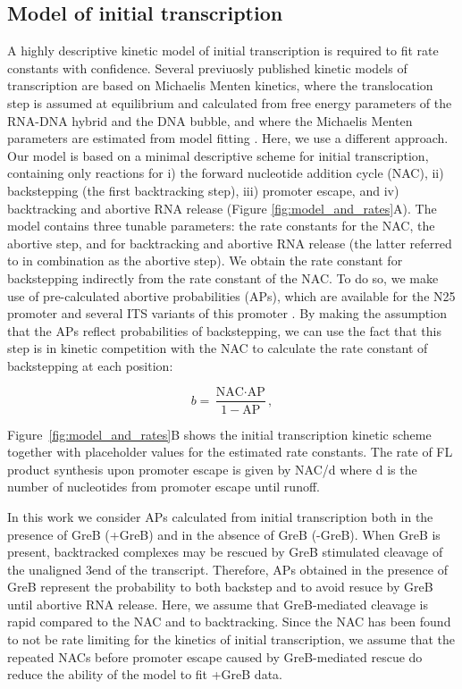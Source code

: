 %
\subsection{Model of initial transcription}
A highly descriptive kinetic model of initial transcription is required to fit
rate constants with confidence. Several previuosly published kinetic models of
transcription are based on Michaelis Menten kinetics, where the translocation
step is assumed at equilibrium and calculated from free energy parameters of
the RNA-DNA hybrid and the DNA bubble, and where
the Michaelis Menten parameters are estimated from model fitting
\cite{guajardo_model_1997, bai_sequence-dependent_2004,
bai_mechanochemical_2007, tadigotla_thermodynamic_2006}. Here, we use a
different approach. Our model is based on a minimal descriptive scheme for
initial transcription, containing only reactions for i) the forward nucleotide
addition cycle (NAC), ii) backstepping (the first backtracking step), iii)
promoter escape, and iv) backtracking and abortive RNA release (Figure
\ref{fig:model_and_rates}A). The model contains three tunable parameters:
the rate constants for the NAC, the abortive step, and for backtracking and
abortive RNA release (the latter referred to in combination as the abortive
step). We obtain the rate constant for backstepping indirectly from the rate
constant of the NAC. To do so, we make use of pre-calculated abortive
probabilities\cite{hsu_quantitative_1996} (APs), which are available for the
N25 promoter and several ITS variants of this promoter
\cite{hsu_initial_2006}. By making the assumption that the APs reflect
probabilities of backstepping, we can use the fact that this step is in
kinetic competition with the NAC to calculate the rate constant of
backstepping at each position:

\begin{equation*}
  b = \frac{\text{NAC}\cdot \text{AP}}{1-\text{AP}},
\end{equation*}

Figure~\ref{fig:model_and_rates}B shows the initial transcription kinetic scheme
together with placeholder values for the estimated rate constants.
The rate of FL product synthesis upon promoter escape is given by NAC/d
where d is the number of nucleotides from promoter escape until runoff.

In this work we consider APs calculated from initial transcription both in the
presence of GreB (+GreB) and in the absence of GreB (-GreB). When GreB is
present, backtracked complexes may be rescued by GreB stimulated cleavage of
the unaligned 3\ppp end of the transcript. Therefore, APs obtained in the
presence of GreB represent the probability to both backstep and to avoid
resuce by GreB until abortive RNA release. Here, we assume that GreB-mediated
cleavage is rapid compared to the NAC and to backtracking. Since the NAC has
been found to not be rate limiting for the kinetics of initial transcription,
we assume that the repeated NACs before promoter escape caused by
GreB-mediated rescue do reduce the ability of the model to fit +GreB data.

